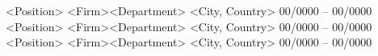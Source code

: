 \begin{cvhonors}
	\cvhonor
	{<Position>}
	{<Firm>\enskip\cdotp\enskip <Department>}
	{<City, Country>}
	{00/0000 -- 00/0000}
	\cvhonor
	{<Position>}
	{<Firm>\enskip\cdotp\enskip <Department>}
	{<City, Country>}
	{00/0000 -- 00/0000}
    \cvhonor
	{<Position>}
	{<Firm>\enskip\cdotp\enskip <Department>}
	{<City, Country>}
	{00/0000 -- 00/0000}
\end{cvhonors}
